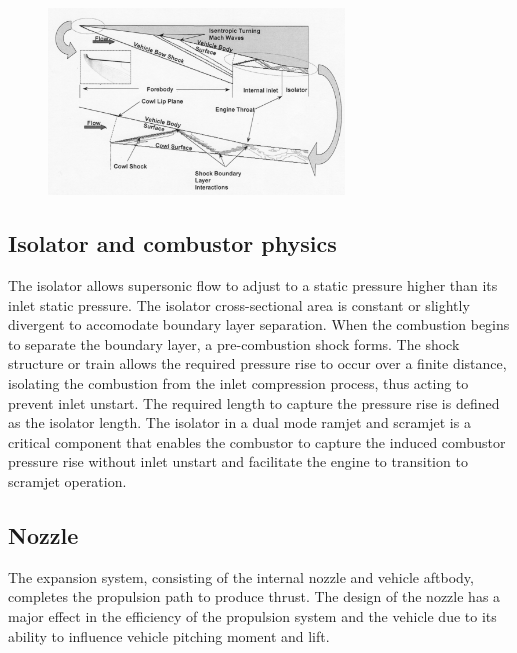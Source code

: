 \documentclass[12pt]{article}
\begin{document}
\begin{figure}[!ht]
\centering
\includegraphics[width=0.7\textwidth]{figures/scram2.png}
\end{figure}

\subsection{Isolator and combustor physics}

The isolator allows supersonic flow to adjust to a static pressure higher than its inlet static pressure. The isolator cross-sectional area is constant or slightly divergent to accomodate boundary layer separation. When the combustion begins to separate the boundary layer, a pre-combustion shock forms. The shock structure or train allows the required pressure rise to occur over a finite distance, isolating the combustion from the inlet compression process, thus acting to prevent inlet unstart. The required length to capture the pressure rise is defined as the isolator length. The isolator in a dual mode ramjet and scramjet is a critical component that enables the combustor to capture the induced combustor pressure rise without inlet unstart and facilitate the engine to transition to scramjet operation.

\subsection{Nozzle}

The expansion system, consisting of the internal nozzle and vehicle aftbody, completes the propulsion path to produce thrust. The design of the nozzle has a major effect in the efficiency of the propulsion system and the vehicle due to its ability to influence vehicle pitching moment and lift.
\end{document}
